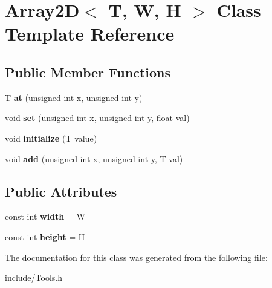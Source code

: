 \hypertarget{class_array2_d}{}\section{Array2D$<$ T, W, H $>$ Class Template Reference}
\label{class_array2_d}
\subsection*{Public Member Functions}
\begin{DoxyCompactItemize}
\item 
\mbox{\label{class_array2_d_a909b11567eb69cf7efb509feed1387f7}} 
T {\bfseries at} (unsigned int x, unsigned int y)
\item 
\mbox{\label{class_array2_d_af67e301dbdf07e153a822f464a45569f}} 
void {\bfseries set} (unsigned int x, unsigned int y, float val)
\item 
\mbox{\label{class_array2_d_a6f27e55188c55eac183883633250c8e9}} 
void {\bfseries initialize} (T value)
\item 
\mbox{\label{class_array2_d_a3f8ff94d945e22cde6ac3abc94c21720}} 
void {\bfseries add} (unsigned int x, unsigned int y, T val)
\end{DoxyCompactItemize}
\subsection*{Public Attributes}
\begin{DoxyCompactItemize}
\item 
\mbox{\label{class_array2_d_a716ef927af30451b4a61e97ff55bb2a8}} 
const int {\bfseries width} = W
\item 
\mbox{\label{class_array2_d_a6dc1d6e9a2db845b7df33cf3c7eb22be}} 
const int {\bfseries height} = H
\end{DoxyCompactItemize}


The documentation for this class was generated from the following file\+:\begin{DoxyCompactItemize}
\item 
include/Tools.\+h\end{DoxyCompactItemize}
